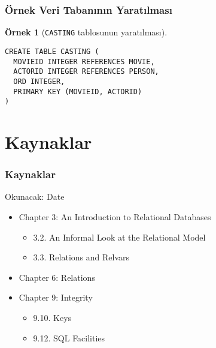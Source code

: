 \documentclass[dvipsnames]{beamer}
\theoremstyle{definition}
\theoremstyle{example}
\newtheorem{ornek}[theorem]{Örnek}
\theoremstyle{plain}
\begin{document}
\begin{frame}[fragile]
  \frametitle{Örnek Veri Tabanının Yaratılması}

  \begin{ornek}[\texttt{CASTING} tablosunun yaratılması]
    \begin{lstlisting}
CREATE TABLE CASTING (
  MOVIEID INTEGER REFERENCES MOVIE,
  ACTORID INTEGER REFERENCES PERSON,
  ORD INTEGER,
  PRIMARY KEY (MOVIEID, ACTORID)
)
    \end{lstlisting}
  \end{ornek}
\end{frame}

\section*{Kaynaklar}

\begin{frame}
  \frametitle{Kaynaklar}

  \begin{block}{Okunacak: Date}
    \begin{itemize}
      \item Chapter 3: An Introduction to Relational Databases
      \begin{itemize}
        \item 3.2. \alert{An Informal Look at the Relational Model}
        \item 3.3. \alert{Relations and Relvars}
      \end{itemize}

      \item Chapter 6: \alert{Relations}

      \item Chapter 9: Integrity
      \begin{itemize}
        \item 9.10. \alert{Keys}
        \item 9.12. \alert{SQL Facilities}
      \end{itemize}
    \end{itemize}
  \end{block}
\end{frame}
\end{document}

